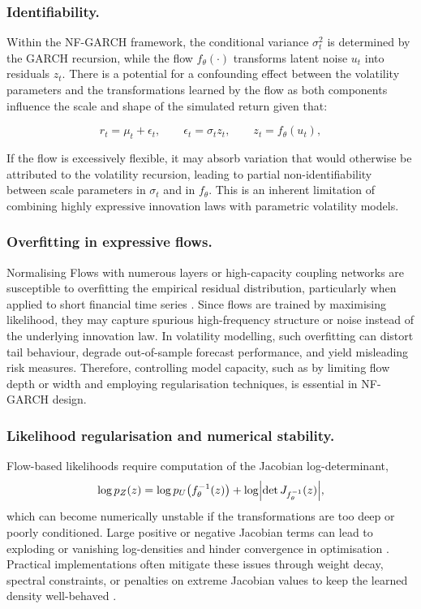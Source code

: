 \documentclass[oneside,12pt]{CUEDthesisPSnPDF}
\newcommand{\parencite}{\citep}
\begin{document}
\subsubsection{Identifiability.}
Within the NF-GARCH framework, the conditional variance $\sigma_t^2$ is determined by the GARCH recursion, while the flow $f_\theta(\cdot)$ transforms latent noise $u_t$ into residuals $z_t$. There is a potential for a confounding effect between the volatility parameters and the transformations learned by the flow as both components influence the scale and shape of the simulated return given that:

\[
r_t = \mu_t + \epsilon_t, \qquad \epsilon_t = \sigma_t z_t, \qquad z_t = f_\theta(u_t),
\]

If the flow is excessively flexible, it may absorb variation that would otherwise be attributed to the volatility recursion, leading to partial non-identifiability between scale parameters in $\sigma_t$ and in $f_\theta$. This is an inherent limitation of combining highly expressive innovation laws with parametric volatility models.\\

\subsubsection{Overfitting in expressive flows.}
Normalising Flows with numerous layers or high-capacity coupling networks are susceptible to overfitting the empirical residual distribution, particularly when applied to short financial time series \parencite{papamakarios2021normalizing}. Since flows are trained by maximising likelihood, they may capture spurious high-frequency structure or noise instead of the underlying innovation law. In volatility modelling, such overfitting can distort tail behaviour, degrade out-of-sample forecast performance, and yield misleading risk measures. Therefore, controlling model capacity, such as by limiting flow depth or width and employing regularisation techniques, is essential in NF-GARCH design.\\

\subsubsection{Likelihood regularisation and numerical stability.}
Flow-based likelihoods require computation of the Jacobian log-determinant,
\[
\log p_Z(z) = \log p_U\big(f^{-1}_\theta(z)\big)
             + \log \Bigl|\det J_{f^{-1}_\theta}(z)\Bigr|,
\]
which can become numerically unstable if the transformations are too deep or poorly conditioned. Large positive or negative Jacobian terms can lead to exploding or vanishing log-densities and hinder convergence in optimisation \parencite{papamakarios2021normalizing}. Practical implementations often mitigate these issues through weight decay, spectral constraints, or penalties on extreme Jacobian values to keep the learned density well-behaved \parencite{papamakarios2021normalizing}.\\
\end{document}

